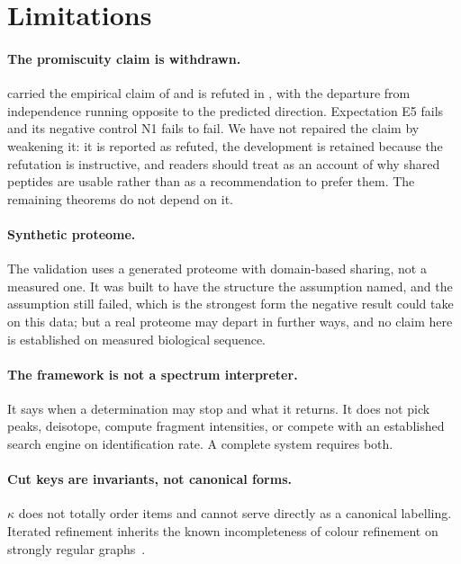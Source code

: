 \documentclass[11pt,a4paper]{article}
\theoremstyle{definition}
\theoremstyle{remark}
\newcommand{\key}{\kappa}                    %
\begin{document}
\section{Limitations}
\label{sec:limitations}

\paragraph{The promiscuity claim is withdrawn.} 
carried the empirical claim of  and is refuted in
, with the departure from independence running
opposite to the predicted direction. Expectation E5 fails and its
negative control N1 fails to fail. We have not repaired the claim by
weakening it: it is reported as refuted, the development is retained
because the refutation is instructive, and readers should treat
 as an account of why shared peptides are usable
rather than as a recommendation to prefer them. The remaining theorems
do not depend on it.

\paragraph{Synthetic proteome.} The validation uses a generated proteome
with domain-based sharing, not a measured one. It was built to have the
structure the assumption named, and the assumption still failed, which
is the strongest form the negative result could take on this data; but a
real proteome may depart in further ways, and no claim here is
established on measured biological sequence.

\paragraph{The framework is not a spectrum interpreter.} It says when a
determination may stop and what it returns. It does not pick peaks,
deisotope, compute fragment intensities, or compete with an established
search engine on identification rate. A complete system requires both.

\paragraph{Cut keys are invariants, not canonical forms.} $\key$ does not
totally order items and cannot serve directly as a canonical labelling.
Iterated refinement inherits the known incompleteness of colour
refinement on strongly regular
graphs~\citep{weisfeiler1968,cai1992optimal}.
\end{document}
